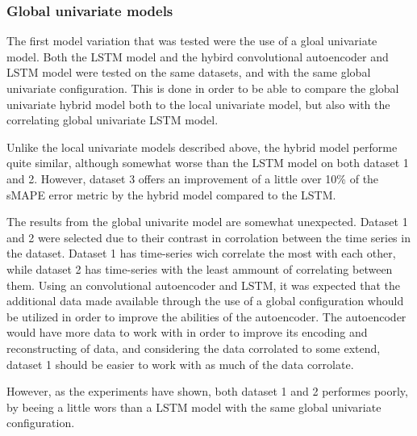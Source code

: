 \subsubsection{Global univariate models}

The first model variation that was tested were the use of a gloal univariate model.
Both the LSTM model and the hybird convolutional autoencoder and LSTM model were tested on the same datasets,
and with the same global univariate configuration.
This is done in order to be able to compare the global univariate hybrid model both to the local univariate model,
but also with the correlating global univariate LSTM model.

Unlike the local univariate models described above, the hybrid model performe quite similar, although somewhat worse than the LSTM model
on both dataset 1 and 2.
However, dataset 3 offers an improvement of a little over 10\% of the sMAPE error metric by the hybrid model compared to the LSTM.

The results from the global univarite model are somewhat unexpected.
Dataset 1 and 2 were selected due to their contrast in corrolation between the time series in the dataset.
Dataset 1 has time-series wich correlate the most with each other, while dataset 2 has time-series with the least ammount of correlating between them.
Using an convolutional autoencoder and LSTM, it was expected that the additional data made available through the use of a global configuration
whould be utilized in order to improve the abilities of the autoencoder.
The autoencoder would have more data to work with in order to improve its encoding and reconstructing of data,
and considering the data corrolated to some extend, dataset 1 should be easier to work with as much of the data corrolate.

However, as the experiments have shown, both dataset 1 and 2 performes poorly, by beeing a little wors than a LSTM model with the same
global univariate configuration.





